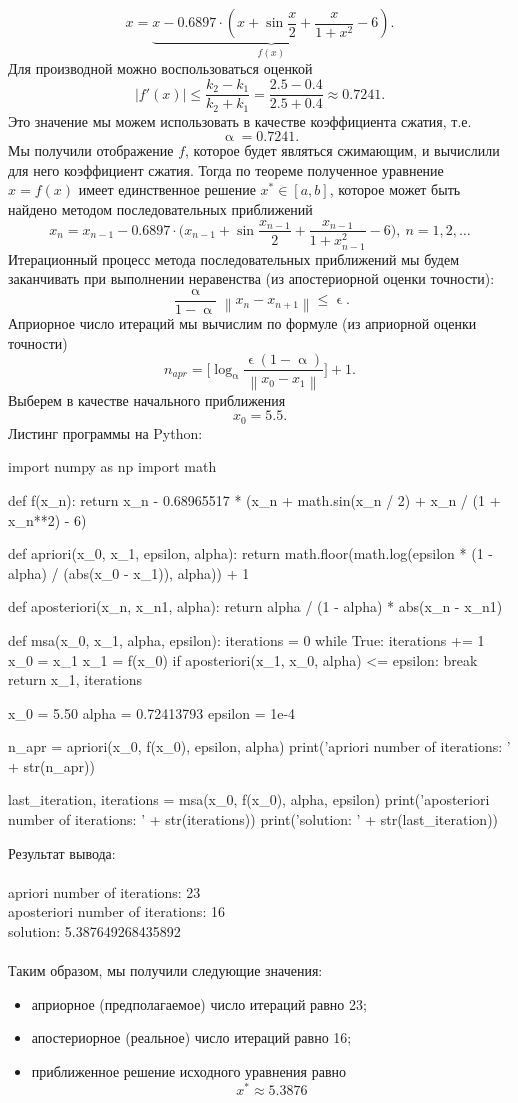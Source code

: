 \documentclass[a4paper, 12pt]{report}
\newcommand\Norm[1]{\left\| #1 \right\|}
\renewcommand{\leq}{\leqslant}
\renewcommand{\alpha}{\upalpha}
\renewcommand{\epsilon}{\upvarepsilon}
\begin{document}
	$$x = \underbrace{x - 0.6897 \cdot (x + \sin\dfrac{x}{2}+\dfrac{x}{1+x^2} - 6)}_{f(x)}.$$
	Для производной можно воспользоваться оценкой
	$$|f'(x)| \leq \dfrac{k_2-k_1}{k_2 + k_1}  = \dfrac{2.5 -0.4}{2.5 + 0.4}\approx 0.7241.$$ 
	Это значение мы можем использовать в качестве коэффициента сжатия, т.е. $$\alpha = 0.7241.$$
	Мы получили отображение $f$, которое будет являться сжимающим, и вычислили для него коэффициент сжатия. Тогда по теореме полученное уравнение $x = f(x)$ имеет единственное решение $x^*\in[a,b]$, которое может быть найдено методом последовательных приближений $$x_n = x_{n-1} - 0.6897 \cdot \Big(x_{n-1} + \sin\dfrac{x_{n-1}}{2}+\dfrac{x_{n-1}}{1+x_{n-1}^2} - 6\Big),\ n=1,2,\ldots$$
	Итерационный процесс метода последовательных приближений мы будем заканчивать при выполнении неравенства (из апостериорной оценки точности):
	$$\dfrac{\alpha}{1 - \alpha}\Norm{x_n - x_{n+1}} \leq \epsilon.$$ 
	Априорное число итераций мы вычислим по формуле (из априорной оценки точности) $$n_{apr} = \Big[\log_\alpha \dfrac{\epsilon(1-\alpha)}{\Norm{x_0 - x_1}}\Big] + 1.$$
	Выберем в качестве начального приближения $$x_0 = 5.5.$$
	Листинг программы на Python:
	\begin{python}
		import numpy as np
		import math
		
		def f(x_n):
			return x_n - 0.68965517 * (x_n + math.sin(x_n / 2) + x_n / (1 + x_n**2)  - 6)
		
		def apriori(x_0, x_1, epsilon, alpha):
			return math.floor(math.log(epsilon * (1 - alpha) / (abs(x_0 - x_1)), alpha)) + 1
		
		def aposteriori(x_n, x_n1, alpha):
			return alpha / (1 - alpha) * abs(x_n - x_n1)
		
		def msa(x_0, x_1, alpha, epsilon):
			iterations = 0
			while True:
			iterations += 1
			x_0 = x_1
			x_1 = f(x_0)
			if aposteriori(x_1, x_0, alpha) <= epsilon:
				break
			return x_1, iterations
		
		x_0 = 5.50
		alpha = 0.72413793
		epsilon = 1e-4
		
		n_apr = apriori(x_0, f(x_0), epsilon, alpha)
		print('apriori number of iterations: ' + str(n_apr))
		
		last_iteration, iterations = msa(x_0, f(x_0), alpha, epsilon)
		print('aposteriori number of iterations: ' + str(iterations))
		print('solution: ' + str(last_iteration))\end{python}
	Результат вывода:\\\\
	apriori number of iterations: 23\\
	aposteriori number of iterations: 16\\
	solution: 5.387649268435892\\\\
	Таким образом, мы получили следующие значения:
	\begin{itemize}
		\item априорное (предполагаемое) число итераций равно 23;
		\item апостериорное (реальное) число итераций равно 16;
		\item приближенное решение исходного уравнения равно $$x^* \approx 5.3876$$
	\end{itemize}
\end{document}
